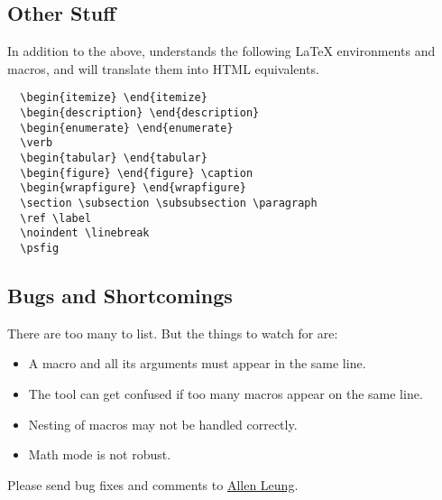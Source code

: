 \subsection{Other Stuff}
  In addition to the above, \MLTeX{} understands the following \LaTeX{}
environments and macros, and will translate them into HTML equivalents.
\begin{verbatim}
  \begin{itemize} \end{itemize}
  \begin{description} \end{description}
  \begin{enumerate} \end{enumerate}
  \verb
  \begin{tabular} \end{tabular}
  \begin{figure} \end{figure} \caption
  \begin{wrapfigure} \end{wrapfigure}
  \section \subsection \subsubsection \paragraph
  \ref \label 
  \noindent \linebreak 
  \psfig  
\end{verbatim}  

\subsection{Bugs and Shortcomings}
   There are too many to list.  But the things to watch for are:
\begin{itemize}
   \item A macro and all its arguments must appear in the same line.
   \item The tool can get confused if too many macros appear on the same line.
   \item Nesting of macros may not be handled correctly.
   \item Math mode is not robust.
\end{itemize}

Please send bug fixes and comments to
\href{mailto:leunga@cs.nyu.edu}{Allen Leung}.
